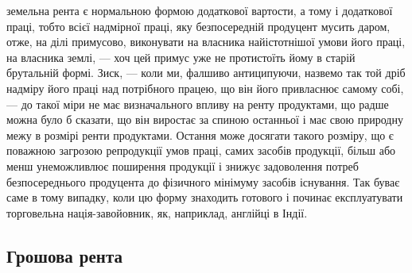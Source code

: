 \parcont{}  %
земельна рента є нормальною формою додаткової вартости, а тому і додаткової
праці, тобто всієї надмірної праці, яку безпосередній продуцент мусить даром,
отже, на ділі примусово, виконувати на власника найістотнішої умови його
праці, на власника землі, — хоч цей примус уже не протистоїть йому в старій
брутальній формі. Зиск, — коли ми, фалшиво антиципуючи, назвемо так той
дріб надміру його праці над потрібного працею, що він його привласнює самому
собі, — до такої міри не має визначального впливу на ренту продуктами, що
радше можна було б сказати, що він виростає за спиною останньої і має свою
природну межу в розмірі ренти продуктами. Остання може досягати такого
розміру, що є поважною загрозою репродукції умов праці, самих засобів продукції,
більш або менш унеможливлює поширення продукції і знижує задоволення
потреб безпосереднього продуцента до фізичного мінімуму засобів
існування. Так буває саме в тому випадку, коли цю форму знаходить готового
і починає експлуатувати торговельна нація-завойовник, як, наприклад, англійці
в Індії.

\subsection{Грошова рента}

